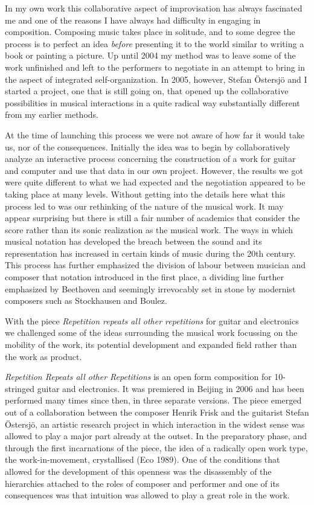 \documentclass[a4paper,hidelinks]{article}
\begin{document}
In my own work this collaborative aspect of improvisation has always fascinated me and one of the reasons I have always had difficulty in engaging in composition. Composing music takes place in solitude, and to some degree the process is to perfect an idea \emph{before} presenting it to the world similar to writing a book or painting a picture. Up until 2004 my method was to leave some of the work unfinished and left to the performers to negotiate in an attempt to bring in the aspect of integrated self-organization. In 2005, however, Stefan Östersjö and I started a project, one that is still going on, that opened up the collaborative possibilities in musical interactions in a quite radical way substantially different from my earlier methods.

At the time of launching this process we were not aware of how far it would take us, nor of the consequences. Initially the idea was to begin by collaboratively analyze an interactive process concerning the construction of a work for guitar and computer and use that data in our own project. However, the results we got were quite different to what we had expected and the negotiation appeared to be taking place at many levels. Without getting into the details here what this process led to was our rethinking of the nature of the musical work. It may appear surprising but there is still a fair number of academics that consider the score rather than its sonic realization as the musical work. The ways in which musical notation has developed the breach between the sound and its representation has increased in certain kinds of music during the 20th century. This process has further emphasized the division of labour between musician and composer that notation introduced in the first place, a dividing line further emphasized by Beethoven and seemingly irrevocably set in stone by modernist composers such as Stockhausen and Boulez.

With the piece \emph{Repetition repeats all other repetitions} for guitar and electronics we challenged some of the ideas surrounding the musical work focussing on the mobility of the work, its potential development and expanded field rather than the work as product.

\emph{Repetition Repeats all other Repetitions} is an open form composition for 10-stringed guitar and electronics. It was premiered in Beijing in 2006 and has been performed many times since then, in three separate versions. The piece emerged out of a collaboration between the composer Henrik Frisk and the guitarist Stefan Östersjö, an artistic research project in which interaction in the widest sense was allowed to play a major part already at the outset. In the preparatory phase, and through the first incarnations of the piece, the idea of a radically open work type, the work-in-movement, crystallised (Eco 1989). One of the conditions that allowed for the development of this openness was the disassembly of the hierarchies attached to the roles of composer and performer and one of its consequences was that intuition was allowed to play a great role in the work.
\end{document}
